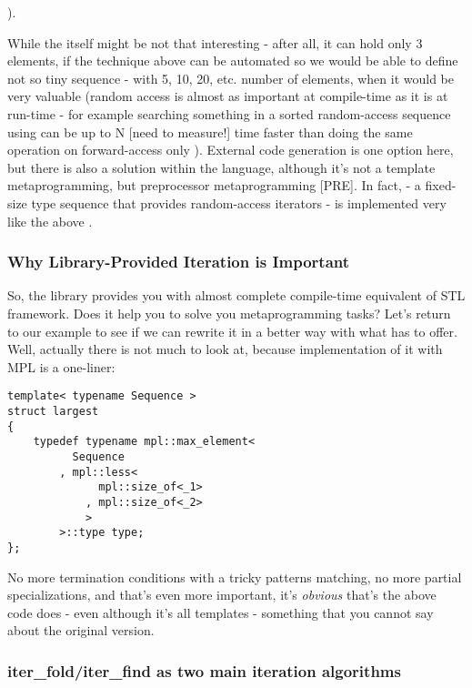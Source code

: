 \documentclass{kapproc}
\begin{document}
).

While the  itself might be not that 
interesting - after all, it can hold only 3 elements, if 
the technique above can be automated so we would be able to 
define not so tiny sequence - with 5, 10, 20, etc. number 
of elements, when it would be very valuable (random access 
is almost as important at compile-time as it is at run-time 
- for example searching something in a sorted random-access 
sequence using  can be up to N 
[need to measure!] time faster than doing the same operation 
on forward-access only ). External code generation 
is one option here, but there is also a solution within the 
language, although it's not a template metaprogramming, 
but preprocessor metaprogramming [PRE]. In fact, 
 - a fixed-size type sequence that 
provides random-access iterators - is implemented very like 
the above . 

\subsubsection{Why Library-Provided Iteration is Important}

So, the library provides you with almost complete compile-time 
equivalent of STL framework. Does it help you to solve you 
metaprogramming tasks? Let's return to our  
example to see if we can rewrite it in a better way with what 
 has to offer. Well, actually there is not 
much to look at, because implementation of it with MPL is a 
one-liner:

{\small
\begin{codesamp}\begin{verbatim}
template< typename Sequence >
struct largest
{
    typedef typename mpl::max_element<
          Sequence
        , mpl::less<
              mpl::size_of<_1>
            , mpl::size_of<_2>
            >
        >::type type;
};
\end{verbatim}
\end{codesamp}
}

No more termination conditions with a tricky patterns matching, 
no more partial specializations, and that's even more important, 
it's \emph{obvious} that's the above code does - even although 
it's all templates - something that you cannot say about the 
original version.

\subsubsection{iter\_fold/iter\_find as two main iteration 
algorithms}
\end{document}
